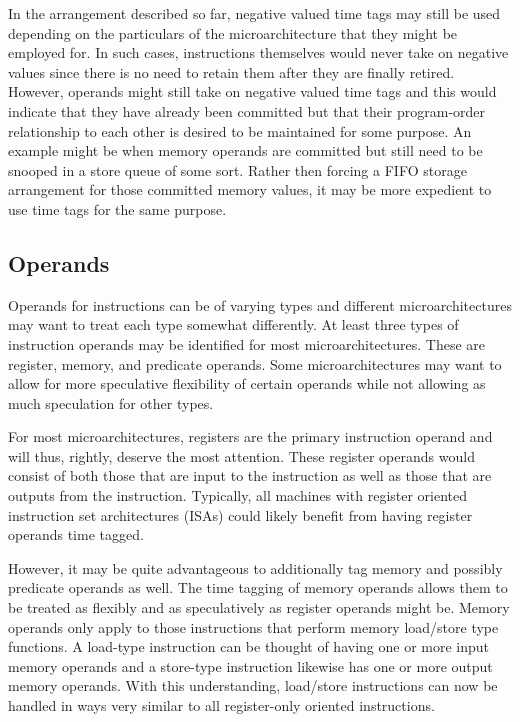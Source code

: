 \documentclass[10pt,dvips]{article}
\begin{document}
In the arrangement described so far, negative valued time tags may still
be used depending on the particulars of the microarchitecture
that they might be employed for.  In such cases, instructions
themselves would never take on negative values since there
is no need to retain them after they are finally retired.
However, operands might still take on negative valued time tags and this
would indicate that they have already been committed but that
their program-order relationship to each other is desired
to be maintained for some purpose.
An example might be when memory operands are committed but
still need to be snooped in a store queue of some sort.
Rather then forcing a FIFO storage arrangement for those committed
memory values, it may be more expedient to use time tags
for the same purpose.
%
%
\subsection{Operands}
%
Operands for instructions can be of varying types and
different microarchitectures may want to treat each type
somewhat differently.
At least three types of instruction operands may be identified
for most microarchitectures.
These are register, memory, and predicate operands.
Some microarchitectures may want to allow for more speculative
flexibility of certain operands while not allowing
as much speculation for other types.

For most microarchitectures, registers are the primary instruction
operand and will thus, rightly, deserve the most attention.
These register operands would consist of both those
that are input to the instruction as well as those that
are outputs from the instruction.
Typically, all machines with register oriented instruction set
architectures (ISAs) could
likely benefit from having register operands time tagged.

However, it may be quite advantageous to additionally tag 
memory and possibly predicate operands as well.
The time tagging of memory operands allows them to be
treated as flexibly and as speculatively as register operands
might be.  
Memory operands only apply to those instructions that
perform memory load/store type functions.  
A load-type instruction
can be thought of having one or more input memory operands
and a store-type instruction likewise has one or more output
memory operands.  With this understanding, load/store instructions
can now be handled in ways very similar to all register-only
oriented instructions.
\end{document}
